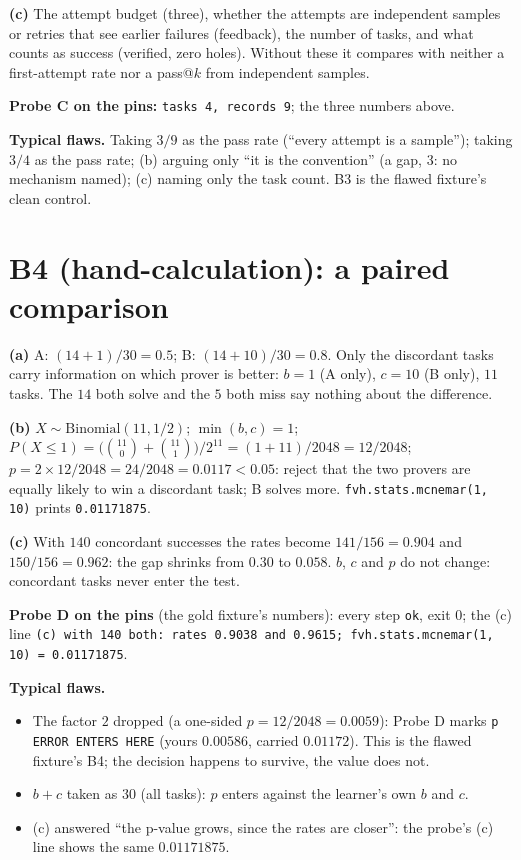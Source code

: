 \documentclass[11pt]{article}
\begin{document}
\textbf{(c)} The attempt budget (three), whether the attempts are independent
samples or retries that see earlier failures (feedback), the number of tasks,
and what counts as success (verified, zero holes). Without these it compares
with neither a first-attempt rate nor a pass@$k$ from independent samples.

\textbf{Probe C on the pins:} \texttt{tasks 4, records 9}; the three numbers
above.

\textbf{Typical flaws.} Taking $3/9$ as the pass rate (``every attempt is a
sample''); taking $3/4$ as the pass rate; (b) arguing only ``it is the
convention'' (a gap, 3: no mechanism named); (c) naming only the task count.
B3 is the flawed fixture's clean control.

\section*{B4 (hand-calculation): a paired comparison}

\textbf{(a)} A: $(14 + 1)/30 = 0.5$; B: $(14 + 10)/30 = 0.8$. Only the
discordant tasks carry information on which prover is better: $b = 1$ (A only),
$c = 10$ (B only), $11$ tasks. The $14$ both solve and the $5$ both miss say
nothing about the difference.

\textbf{(b)} $X \sim \mathrm{Binomial}(11, 1/2)$; $\min(b, c) = 1$;
$P(X \leq 1) = \bigl(\binom{11}{0} + \binom{11}{1}\bigr)/2^{11} = (1 + 11)/2048
= 12/2048$; $p = 2 \times 12/2048 = 24/2048 = 0.0117 < 0.05$: reject that the
two provers are equally likely to win a discordant task; B solves more.
\texttt{fvh.stats.mcnemar(1, 10)} prints \texttt{0.01171875}.

\textbf{(c)} With $140$ concordant successes the rates become $141/156 = 0.904$
and $150/156 = 0.962$: the gap shrinks from $0.30$ to $0.058$. $b$, $c$ and $p$
do not change: concordant tasks never enter the test.

\textbf{Probe D on the pins} (the gold fixture's numbers): every step
\texttt{ok}, exit 0; the (c) line
\texttt{(c) with 140 both: rates 0.9038 and 0.9615; fvh.stats.mcnemar(1, 10) =
0.01171875}.

\textbf{Typical flaws.}
\begin{itemize}
\item The factor $2$ dropped (a one-sided $p = 12/2048 = 0.0059$): Probe D marks
  \texttt{p} \texttt{ERROR ENTERS HERE} (yours $0.00586$, carried $0.01172$).
  This is the flawed fixture's B4; the decision happens to survive, the value
  does not.
\item $b + c$ taken as $30$ (all tasks): $p$ enters against the learner's own
  $b$ and $c$.
\item (c) answered ``the p-value grows, since the rates are closer'': the
  probe's (c) line shows the same $0.01171875$.
\end{itemize}
\end{document}
